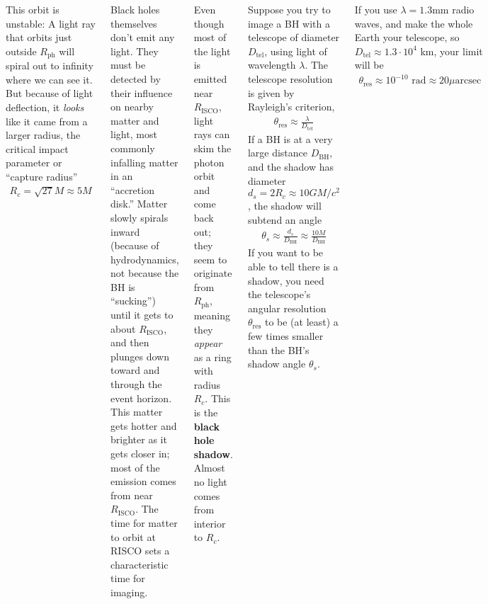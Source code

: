 \documentclass[25pt, a0paper, landscape]{tikzposter}
\begin{document}
\begin{columns}
{      This orbit is unstable: A light ray that orbits just outside
      $R_{\text{ph}}$ will spiral out to infinity where we can see it. But
      because of light deflection, it \emph{looks} like it came from a larger
      radius, the critical impact parameter or ``capture radius''
      \begin{align*}
        R_{c} =\sqrt{27}M \approx 5M
      \end{align*}

      Black holes themselves don’t emit any light. They must be
      detected by their influence on nearby matter and light, most
      commonly infalling matter in an ``accretion disk.'' Matter
      slowly spirals inward (because of hydrodynamics, not because the
      BH is ``sucking'') until it gets to about $R_{\text{ISCO}}$, and
      then plunges down toward and through the event horizon. This
      matter gets hotter and brighter as it gets closer in; most of
      the emission comes from near $R_{\text{ISCO}}$. The time for
      matter to orbit at RISCO sets a characteristic time for imaging.

      Even though most of the light is emitted near $R_{\text{ISCO}}$,
      light rays can skim the photon orbit and come back out; they
      seem to originate from $R_{\text{ph}}$, meaning they \emph{appear} as a
      ring with radius $R_{c}$. This is the \textbf{black hole
        shadow}. Almost no light comes from interior to $R_c$.
    }

    {
      Suppose you try to image a BH with a telescope of diameter
      $D_{\text{tel}}$, using light of wavelength $\lambda$. The
      telescope resolution is given by Rayleigh’s criterion,
      \begin{align*}
        \theta_{\text{res}} \approx \frac{\lambda}{D_{\text{tel}}}
      \end{align*}
      If a BH is at a very large distance $D_{\text{BH}}$, and the
      shadow has diameter $d_{s}=2R_{c}\approx 10GM/c^{2}$, the shadow
      will subtend an angle
      \begin{align*}
        \theta_{s} \approx \frac{d_{s}}{D_{\text{BH}}} \approx \frac{10 M}{D_{\text{BH}}}
      \end{align*}
      If you want to be able to tell there is a shadow, you need the
      telescope’s angular resolution $\theta_{\text{res}}$ to be (at
      least) a few times smaller than the BH’s shadow angle
      $\theta_{s}$.

      If you use $\lambda=1.3$mm radio waves, and make the whole Earth
      your telescope, so $D_{\text{tel}} \approx 1.3\cdot 10^{4}$ km,
      your limit will be
      \begin{align*}
        \theta_{\text{res}} \approx 10^{-10} \text{~rad} \approx 20 \mu\text{arcsec}
      \end{align*}

}
\end{columns}
\end{document}
